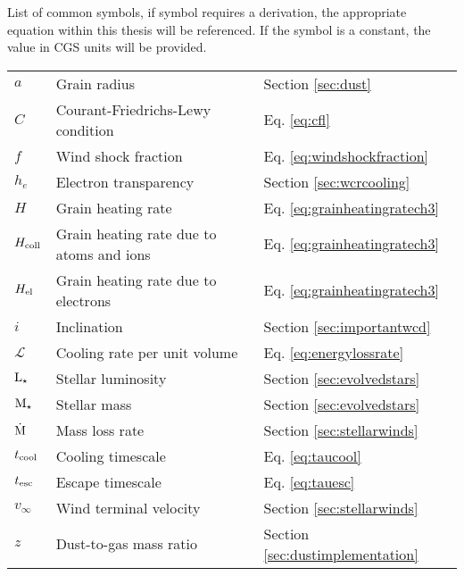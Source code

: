 \begin{Common_Symbols}

List of common symbols, if symbol requires a derivation, the appropriate equation within this thesis will be referenced. If the symbol is a constant, the value in CGS units will be provided. 

\begin{longtable}[c]{lll}
  \hline
  \endhead
  \hline
  \endfoot




  \multicolumn{3}{c}{\textbf{Variables}} \\
  \hline

  $a$ & Grain radius & Section \ref{sec:dust} \\
  $C$ & Courant-Friedrichs-Lewy condition & Eq. \ref{eq:cfl} \\ 
  $f$ & Wind shock fraction & Eq. \ref{eq:windshockfraction} \\
  $h_e$ & Electron transparency & Section \ref{sec:wcrcooling} \\
  $H$ & Grain heating rate & Eq. \ref{eq:grainheatingratech3} \\
  $H_\text{coll}$ & Grain heating rate due to atoms and ions & Eq. \ref{eq:grainheatingratech3} \\
  $H_\text{el}$ & Grain heating rate due to electrons & Eq. \ref{eq:grainheatingratech3} \\
  $i$ & Inclination & Section \ref{sec:importantwcd} \\
  $\mathcal{L}$ & Cooling rate per unit volume & Eq. \ref{eq:energylossrate} \\ 
  $\text{L}_\star$ & Stellar luminosity & Section \ref{sec:evolvedstars} \\
  $\text{M}_\star$ & Stellar mass & Section \ref{sec:evolvedstars} \\
  $\dot{\text{M}}$ & Mass loss rate & Section \ref{sec:stellarwinds} \\
  $t_\text{cool}$ & Cooling timescale & Eq. \ref{eq:taucool} \\
  $t_\text{esc}$ & Escape timescale & Eq. \ref{eq:tauesc} \\
  $v_\infty$ & Wind terminal velocity & Section \ref{sec:stellarwinds} \\
  $z$ & Dust-to-gas mass ratio & Section \ref{sec:dustimplementation} \\


\end{longtable}
\end{Common_Symbols}
